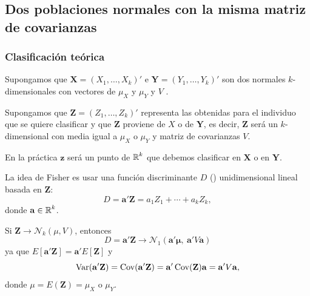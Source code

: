 \subsection{Dos poblaciones normales con la misma matriz de covarianzas}
\subsubsection{Clasificación teórica}
Supongamos que $\mathbf{X}=(X_1,\dots,X_k)'$ e $\mathbf{Y}=(Y_1,\dots,Y_k)'$ son dos \veas normales $k$-dimensionales con vectores de  $\mu_X$ y $\mu_Y$ y  $V$ .

Supongamos que $\mathbf{Z}=(Z_1,\dots,Z_k)'$ representa las  obtenidas para el individuo que se quiere clasificar y que $\mathbf{Z}$ proviene de $X$ o de $\mathbf{Y}$, es decir, $\mathbf{Z}$ será un \vea $k$-dimensional con media igual a $\mu_X$ o $\mu_Y$ y matriz de covarianzas $V$.

En la práctica $\mathbf{z}$ será un punto de $\operatorname{\mathbb{R}}^k$ que debemos clasificar en $\mathbf{X}$ o en $\mathbf{Y}$.

La idea de Fisher es usar una función discriminante $D$ () unidimensional lineal basada en $\mathbf{Z}$: \[ D=\mathbf{a'Z}=a_1Z_1+\cdots+a_kZ_k, \]donde $\mathbf{a}\in\operatorname{\mathbb{R}}^k$.

Si $\mathbf{Z}\longrightarrow\mathcal{N}_k(\mu,V)$, entonces \[ D=\mathbf{a'Z}\longrightarrow \mathcal{N}_1(\mathbf{a'\mu},\: \mathbf{a'}V\mathbf{a}) \]ya que $E[\mathbf{a'Z}]=\mathbf{a'}E[\mathbf{Z}]$ y \[ \operatorname{Var}(\mathbf{a'Z})=\operatorname{Cov}(\mathbf{a'Z})=\mathbf{a'}\operatorname{Cov}(\mathbf{Z})\mathbf{a}=\mathbf{a'}V\mathbf{a}, \]donde $\mu=E(\mathbf{Z})=\mu_X$ o $\mu_Y$.

